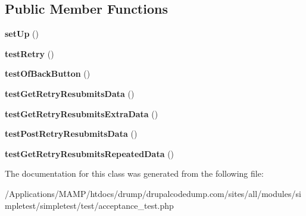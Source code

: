 \subsection*{Public Member Functions}
\begin{DoxyCompactItemize}
\item 
\hypertarget{class_test_of_live_history_navigation_a58e0d2424418d8fbbb1b2cb23c9f65c9}{
{\bfseries setUp} ()}
\label{class_test_of_live_history_navigation_a58e0d2424418d8fbbb1b2cb23c9f65c9}

\item 
\hypertarget{class_test_of_live_history_navigation_aad60420b8da3e399fa22b4cbfe056b0e}{
{\bfseries testRetry} ()}
\label{class_test_of_live_history_navigation_aad60420b8da3e399fa22b4cbfe056b0e}

\item 
\hypertarget{class_test_of_live_history_navigation_a43de963d8c3e0b5ec57a2558f3e70aca}{
{\bfseries testOfBackButton} ()}
\label{class_test_of_live_history_navigation_a43de963d8c3e0b5ec57a2558f3e70aca}

\item 
\hypertarget{class_test_of_live_history_navigation_a9ab254f848f639527825483dec2a7b0b}{
{\bfseries testGetRetryResubmitsData} ()}
\label{class_test_of_live_history_navigation_a9ab254f848f639527825483dec2a7b0b}

\item 
\hypertarget{class_test_of_live_history_navigation_a44c4cbe43256b08e8b87e23c0b2f01c7}{
{\bfseries testGetRetryResubmitsExtraData} ()}
\label{class_test_of_live_history_navigation_a44c4cbe43256b08e8b87e23c0b2f01c7}

\item 
\hypertarget{class_test_of_live_history_navigation_a3030ee6665782a1177afedf3af4b2759}{
{\bfseries testPostRetryResubmitsData} ()}
\label{class_test_of_live_history_navigation_a3030ee6665782a1177afedf3af4b2759}

\item 
\hypertarget{class_test_of_live_history_navigation_ad5c614c791c6f7182cc37089ad741351}{
{\bfseries testGetRetryResubmitsRepeatedData} ()}
\label{class_test_of_live_history_navigation_ad5c614c791c6f7182cc37089ad741351}

\end{DoxyCompactItemize}


The documentation for this class was generated from the following file:\begin{DoxyCompactItemize}
\item 
/Applications/MAMP/htdocs/drump/drupalcodedump.com/sites/all/modules/simpletest/simpletest/test/acceptance\_\-test.php\end{DoxyCompactItemize}
